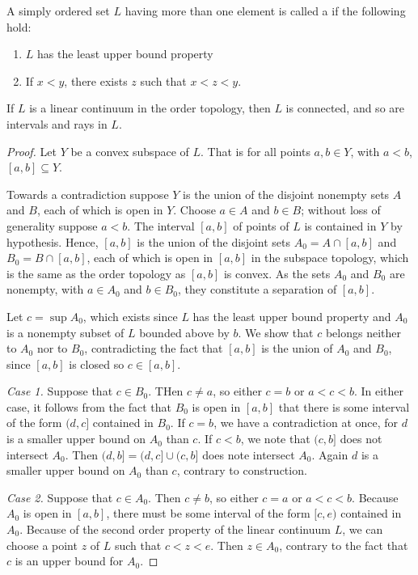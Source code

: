 \documentclass[12pt, a4paper, oneside, openright, titlepage]{book}
\begin{document}
\begin{defn}
    A simply ordered set $L$ having more than one element is called a  if the following hold: \begin{enumerate}
        \item $L$ has the least upper bound property
        \item If $x < y$, there exists $z$ such that $x < z < y$.
    \end{enumerate}
\end{defn}

\begin{thm}
    If $L$ is a linear continuum in the order topology, then $L$ is connected, and so are intervals and rays in $L$.
\end{thm}
\begin{proof}
    Let $Y$ be a convex subspace of $L$. That is for all points $a,b \in Y$, with $a<b$, $[a,b] \subseteq Y$.

    Towards a contradiction suppose $Y$ is the union of the disjoint nonempty sets $A$ and $B$, each of which is open in $Y$. Choose $a \in A$ and $b \in B$; without loss of generality suppose $a < b$. The interval $[a,b]$ of points of $L$ is contained in $Y$ by hypothesis. Hence, $[a,b]$ is the union of the disjoint sets $A_0 = A\cap [a,b]$ and $B_0 = B\cap[a,b]$, each of which is open in $[a,b]$ in the subspace topology, which is the same as the order topology as $[a,b]$ is convex. As the sets $A_0$ and $B_0$ are nonempty, with $a \in A_0$ and $b \in B_0$, they constitute a separation of $[a,b]$.

    Let $c = \sup A_0$, which exists since $L$ has the least upper bound property and $A_0$ is a nonempty subset of $L$ bounded above by $b$. We show that $c$ belongs neither to $A_0$ nor to $B_0$, contradicting the fact that $[a,b]$ is the union of $A_0$ and $B_0$, since $[a,b]$ is closed so $c\in[a,b]$.


    \emph{Case 1.} Suppose that $c \in B_0$. THen $c \neq a$, so either $c = b$ or $a < c < b$. In either case, it follows from the fact that $B_0$ is open in $[a,b]$ that there is some interval of the form $(d,c]$ contained in $B_0$. If $c = b$, we have a contradiction at once, for $d$ is a smaller upper bound on $A_0$ than $c$. If $c < b$, we note that $(c,b]$ does not intersect $A_0$. Then $(d,b] = (d,c] \cup (c,b]$ does note intersect $A_0$. Again $d$ is a smaller upper bound on $A_0$ than $c$, contrary to construction.


    \emph{Case 2.} Suppose that $c \in A_0$. Then $c \neq b$, so either $c = a$ or $a < c < b$. Because $A_0$ is open in $[a,b]$, there must be some interval of the form $[c,e)$ contained in $A_0$. Because of the second order property of the linear continuum $L$, we can choose a point $z$ of $L$ such that $c < z < e$. Then $z \in A_0$, contrary to the fact that $c$ is an upper bound for $A_0$.
\end{proof}
\end{document}

